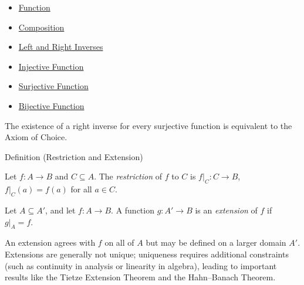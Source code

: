 \begin{dependencies}
\begin{itemize}
  \item \hyperref[def:function]{Function}
  \item \hyperref[def:composition]{Composition}
  \item \hyperref[def:left-right-inverse]{Left and Right Inverses}
  \item \hyperref[def:injective]{Injective Function}
  \item \hyperref[def:surjective]{Surjective Function}
  \item \hyperref[def:bijective]{Bijective Function}
\end{itemize}
\end{dependencies}

\begin{remark*}
The existence of a right inverse for every surjective function is equivalent
to the Axiom of Choice.
\end{remark*}

\begin{definitionbox}{Definition (Restriction and Extension)}
\begin{definition}\label{def:restriction}
Let $f : A \to B$ and $C \subseteq A$. The \emph{restriction} of $f$ to $C$
is $f|_C : C \to B$, $f|_C(a) = f(a)$ for all $a \in C$.

Let $A \subseteq A'$, and let $f : A \to B$. A function $g : A' \to B$ is an
\emph{extension} of $f$ if $g|_A = f$.
\end{definition}
\end{definitionbox}

\begin{remark*}
\label{def:fn-extension}
An extension agrees with $f$ on all of $A$ but may be defined on a larger
domain $A'$. Extensions are generally not unique; uniqueness requires additional
constraints (such as continuity in analysis or linearity in algebra), leading to
important results like the Tietze Extension Theorem and the Hahn--Banach
Theorem.
\end{remark*}

